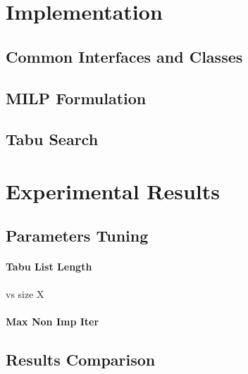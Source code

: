 \documentclass{article}
\begin{document}
\section{Implementation}

\subsection{Common Interfaces and Classes}
\subsection{MILP Formulation}
\subsection{Tabu Search}

\section{Experimental Results}

\subsection{Parameters Tuning}
\paragraph{Tabu List Length} vs size X
\paragraph{Max Non Imp Iter}

\subsection{Results Comparison}

\nocite{*}
\printbibliography
\end{document}
